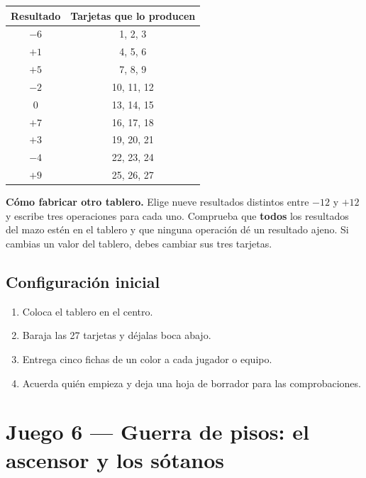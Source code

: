 \documentclass[12pt, letterpaper]{article}
\begin{document}
\begin{center}
\small
\begin{tabular}{@{}c c@{}}
\toprule
\textbf{Resultado} & \textbf{Tarjetas que lo producen}\\
\midrule
$-6$ & 1, 2, 3\\
$+1$ & 4, 5, 6\\
$+5$ & 7, 8, 9\\
$-2$ & 10, 11, 12\\
$0$ & 13, 14, 15\\
$+7$ & 16, 17, 18\\
$+3$ & 19, 20, 21\\
$-4$ & 22, 23, 24\\
$+9$ & 25, 26, 27\\
\bottomrule
\end{tabular}
\end{center}

\begin{cuadroadvertencia}
\textbf{Cómo fabricar otro tablero.} Elige nueve resultados distintos entre $-12$ y $+12$ y escribe tres operaciones para cada uno. Comprueba que \textbf{todos} los resultados del mazo estén en el tablero y que ninguna operación dé un resultado ajeno. Si cambias un valor del tablero, debes cambiar sus tres tarjetas.
\end{cuadroadvertencia}

\subsection{Configuración inicial}

\begin{enumerate}[leftmargin=*]
  \item Coloca el tablero en el centro.
  \item Baraja las 27 tarjetas y déjalas boca abajo.
  \item Entrega cinco fichas de un color a cada jugador o equipo.
  \item Acuerda quién empieza y deja una hoja de borrador para las comprobaciones.
\end{enumerate}

\clearpage
\section{Juego 6 — Guerra de pisos: el ascensor y los sótanos}
\end{document}
